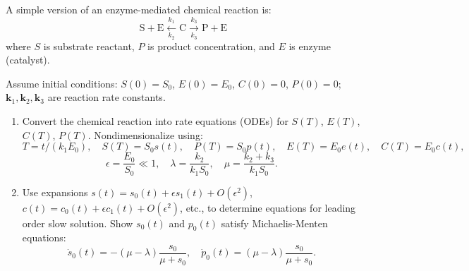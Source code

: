 \begin{exercise}
\label{applied:2016:2}
A simple version of an enzyme-mediated chemical reaction is:
\[
\mathrm{S}+\mathrm{E}\xleftarrow[k_{2}]{k_{1}}\mathrm{C}\xrightarrow[k_{3}]{k_{3}}\mathrm{P}+\mathrm{E}
\]
where $S$ is substrate reactant, $P$ is product concentration, and $E$ is enzyme (catalyst).

Assume initial conditions: $S(0)=S_{0}$, $E(0)=E_{0}$, $C(0)=0$, $P(0)=0$; $\mathbf{k}_{1},\mathbf{k}_{2},\mathbf{k}_{3}$ are reaction rate constants.

\begin{enumerate}
\item[(a)] Convert the chemical reaction into rate equations (ODEs) for $S(T)$, $E(T)$, $C(T)$, $P(T)$. Nondimensionalize using:
\[
T=t/(k_{1}E_{0}),\quad S(T)=S_{0}s(t),\quad P(T)=S_{0}p(t),\quad E(T)=E_{0}e(t),\quad C(T)=E_{0}c(t),
\]
\[
\epsilon=\frac{E_{0}}{S_{0}}\ll 1,\quad \lambda=\frac{k_{2}}{k_{1}S_{0}},\quad \mu=\frac{k_{2}+k_{3}}{k_{1}S_{0}}.
\]
\item[(b)] Use expansions $s(t)=s_{0}(t)+\epsilon s_{1}(t)+O(\epsilon^{2})$, $c(t)=c_{0}(t)+\epsilon c_{1}(t)+O(\epsilon^{2})$, etc., to determine equations for leading order slow solution. Show $s_{0}(t)$ and $p_{0}(t)$ satisfy Michaelis-Menten equations:
\[
\dot{s}_{0}(t)=-(\mu-\lambda)\frac{s_{0}}{\mu+s_{0}},\quad \dot{p}_{0}(t)=(\mu-\lambda)\frac{s_{0}}{\mu+s_{0}}.
\]
\end{enumerate}
\end{exercise}

